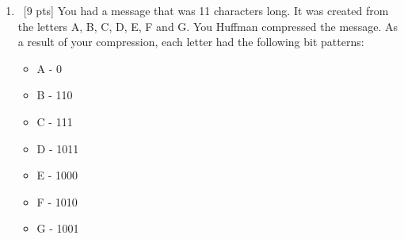 \documentclass[12pt]{article}
\newenvironment{sol}[1][Solution]{\begin{trivlist}\item[\hskip\labelsep {\bfseries #1:}]}{\end{trivlist}}
\begin{document}
\begin{enumerate}
    \item \ [9 pts] You had a message that was 11 characters long. It was created from the letters A, B, C, D, E, F and G. You Huffman compressed the message. As a result of your compression, each letter had the following bit patterns:
    \begin{itemize}
        \item A - 0
        \item B - 110
        \item C - 111
        \item D - 1011
        \item E - 1000
        \item F - 1010
        \item G - 1001
    \end{itemize}
\end{enumerate}
\end{document}
